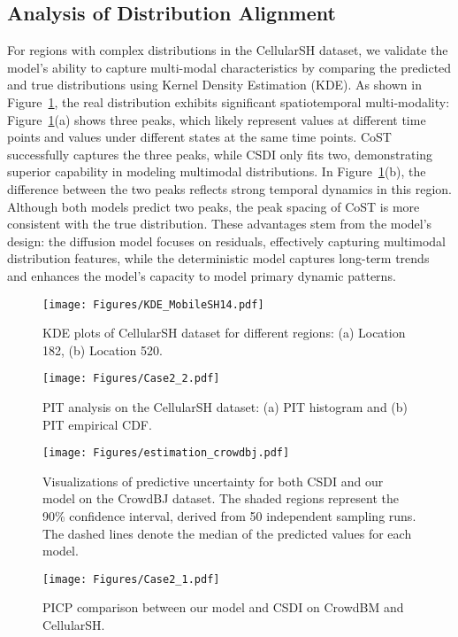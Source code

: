 \subsection{Analysis of Distribution Alignment}
For regions with complex distributions in the CellularSH dataset, we validate the model's ability to capture multi-modal characteristics by comparing the predicted and true distributions using Kernel Density Estimation (KDE). As shown in Figure~\ref{fig:KDE}, the real distribution exhibits significant spatiotemporal multi-modality: Figure~\ref{fig:KDE}(a) shows three peaks, which likely represent values at different time points and values under different states at the same time points. CoST successfully captures the three peaks, while CSDI only fits two, demonstrating superior capability in modeling multimodal distributions. In Figure~\ref{fig:KDE}(b), the difference between the two peaks reflects strong temporal dynamics in this region. Although both models predict two peaks, the peak spacing of CoST is more consistent with the true distribution. These advantages stem from the model's design: the diffusion model focuses on residuals, effectively capturing multimodal distribution features, while the deterministic model captures long-term trends and enhances the model's capacity to model primary dynamic patterns.


\begin{figure}[t]

    \centering
    \texttt{[image: Figures/KDE\_MobileSH14.pdf]}
    \vspace{-6mm}
    \caption{KDE plots of CellularSH dataset for different regions: (a) Location 182, (b) Location 520.}
    \label{fig:KDE}
    \vspace{-5mm}
\end{figure}
\begin{figure}[t]
    \centering
    \texttt{[image: Figures/Case2\_2.pdf]}
    \vspace{-5mm}
    \caption{PIT analysis on the CellularSH dataset: (a) PIT histogram and (b) PIT empirical CDF.}
    \label{fig:PIT}
    \vspace{-3mm}
\end{figure}
\begin{figure}[t]
    \centering
    \texttt{[image: Figures/estimation\_crowdbj.pdf]}
    \vspace{-5mm}
    \caption{Visualizations of predictive uncertainty for both CSDI and our model on the CrowdBJ dataset. The shaded regions represent the 90\% confidence interval, derived from 50 independent sampling runs. The dashed lines denote the median of the predicted values for each model.}
    \label{fig:estimation}
\end{figure}
\begin{figure}[t]
    \centering
    \texttt{[image: Figures/Case2\_1.pdf]}
    \vspace{-3mm}
    \caption{PICP comparison between our model and CSDI on CrowdBM and CellularSH.}
    \vspace{-5mm}
    \label{fig:PICP}
\end{figure}




